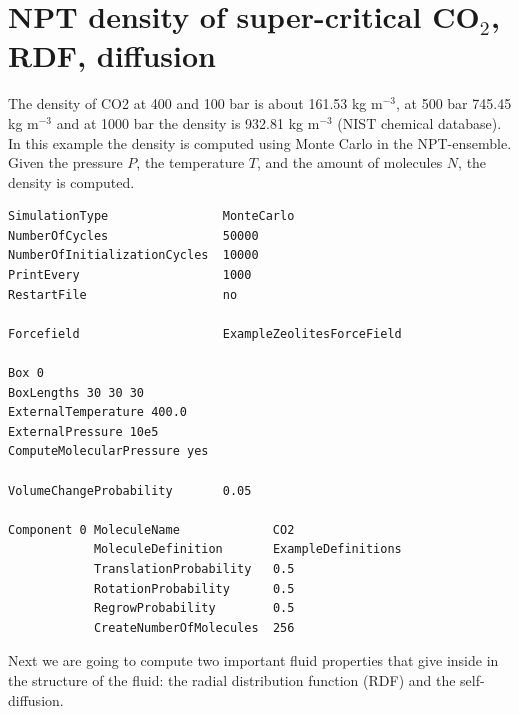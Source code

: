 \section{NPT density of super-critical CO$_2$, RDF, diffusion}

The density of CO2 at 400 and 100 bar is about 161.53 kg m$^{-3}$, at 500 bar 745.45 kg m$^{-3}$ and at 1000 bar the density is 
932.81 kg m$^{-3}$ (NIST chemical database). In this example the density is
computed using Monte Carlo in the NPT-ensemble. Given the pressure $P$, the temperature $T$, and the amount of molecules $N$,
the density is computed.

\begin{verbatim}
SimulationType                MonteCarlo
NumberOfCycles                50000
NumberOfInitializationCycles  10000
PrintEvery                    1000
RestartFile                   no

Forcefield                    ExampleZeolitesForceField

Box 0
BoxLengths 30 30 30
ExternalTemperature 400.0
ExternalPressure 10e5
ComputeMolecularPressure yes

VolumeChangeProbability       0.05

Component 0 MoleculeName             CO2
            MoleculeDefinition       ExampleDefinitions
            TranslationProbability   0.5
            RotationProbability      0.5
            RegrowProbability        0.5
            CreateNumberOfMolecules  256
\end{verbatim}

\begin{center}
\end{center}

Next we are going to compute two important fluid properties that give inside in the structure of the fluid: the radial 
distribution function (RDF) and the self-diffusion.

\begin{center}
\end{center}

